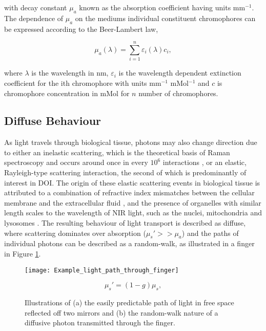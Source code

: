 \documentclass[twoside]{bhamthesis}
\theoremstyle{definition}
\begin{document}
with decay constant $\mu_a$ known as the absorption coefficient having units $\mathrm{mm^{-1}}$. The dependence of $\mu_a$ on the mediums individual constituent chromophores can be expressed according to the Beer-Lambert law,

\begin{equation}
\mu _a (\lambda) = \sum_{i=1}^n \varepsilon_i (\lambda) c_i ,
  \label{eqn:RTE}
\end{equation}

where $\lambda$ is the wavelength in nm, $\varepsilon_i$ is the wavelength dependent extinction coefficient for the ith chromophore with units mm$^{-1}$ mMol$^{-1}$ and $c$ is chromophore concentration in mMol for $n$ number of chromophores. 

\subsection{Diffuse Behaviour}

As light travels through biological tissue, photons may also change direction due to either an inelastic scattering, which is the theoretical basis of Raman spectroscopy and occurs around once in every $\mathrm{10^6}$ interactions \cite{long1977raman}, or an elastic, Rayleigh-type scattering interaction, the second of which is predominantly of interest in DOI. The origin of these elastic scattering events in biological tissue is attributed to a combination of refractive index mismatches between the cellular membrane and the extracellular fluid \cite{mourant2000light}, and the presence of organelles with similar length scales to the wavelength of NIR light, such as the nuclei, mitochondria and lysosomes \cite{mourant2000light,beauvoit1994contribution,marina2012correlating}. The resulting behaviour of light transport is described as diffuse, where scattering dominates over absorption ($\mu_s' >> \mu_a$)  and the paths of individual photons can be described as a random-walk, as illustrated in a finger in Figure \ref{fig:Random_walk}.

\begin{figure}[!ht]
	\begin{minipage}{.7\textwidth}
    \centering
    \texttt{[image: Example\_light\_path\_through\_finger]}
    \caption{Illustrations of (a) the easily predictable path of light in free space reflected off two mirrors and (b) the random-walk nature of a diffusive photon transmitted through the finger.} 
    \label{fig:Random_walk}
  \end{minipage}%
  \begin{minipage}{.3\textwidth}
     \begin{equation}
\mu_s' = (1-g)\mu_s,
  \label{eqn:reduced_scatter}
    \end{equation}
  \end{minipage}
\end{figure}
\end{document}
